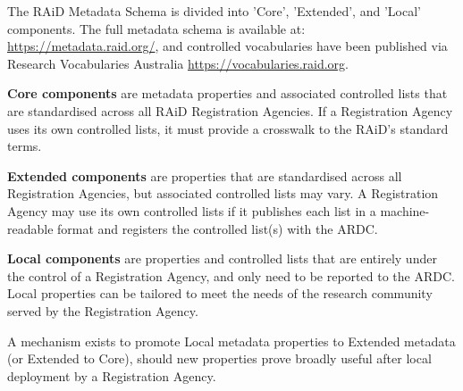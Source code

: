 The RAiD Metadata Schema is divided into 'Core', 'Extended', and 'Local' components. The full metadata schema is available at: \href{https://metadata.raid.org/}{https://metadata.raid.org/}, and controlled vocabularies have been published via Research Vocabularies Australia \href{https://vocabulary.raid.org}{https://vocabularies.raid.org}.

\textbf{Core components} are metadata properties and associated controlled lists that are standardised across all RAiD Registration Agencies. If a Registration Agency uses its own controlled lists, it must provide a crosswalk to the RAiD’s standard terms.

\textbf{Extended components} are properties that are standardised across all Registration Agencies, but associated controlled lists may vary. A Registration Agency may use its own controlled lists if it publishes each list in a machine-readable format and registers the controlled list(s) with the ARDC. 

\textbf{Local components} are properties and controlled lists that are entirely under the control of a Registration Agency, and only need to be reported to the ARDC. Local properties can be tailored to meet the needs of the research community served by the Registration Agency. 

A mechanism exists to promote Local metadata properties to Extended metadata (or Extended to Core), should new properties prove broadly useful after local deployment by a Registration Agency.